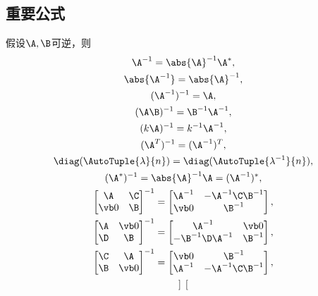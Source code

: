 \subsection*{重要公式}
假设\(\A,\B\)可逆，则\begin{gather*}
	\A^{-1} = \abs{\A}^{-1} \A^*, \\ %
	\abs{\A^{-1}} = \abs{\A}^{-1}, \\ %
	(\A^{-1})^{-1} = \A, \\ %
	(\A \B)^{-1} = \B^{-1} \A^{-1}, \\ %
	(k \A)^{-1} = k^{-1} \A^{-1}, \\ %
	(\A^T)^{-1} = (\A^{-1})^T, \\ %
	\diag(\AutoTuple{\lambda}{n}) = \diag(\AutoTuple{\lambda^{-1}}{n}), \\
	(\A^*)^{-1}
	= \abs{\A}^{-1} \A
	= (\A^{-1})^*, \\ %
	\begin{bmatrix}
		\A & \C \\
		\vb0 & \B
	\end{bmatrix}^{-1}
	= \begin{bmatrix}
		\A^{-1} & -\A^{-1} \C \B^{-1} \\
		\vb0 & \B^{-1}
	\end{bmatrix}, \\
	\begin{bmatrix}
		\A & \vb0 \\
		\D & \B
	\end{bmatrix}^{-1}
	= \begin{bmatrix}
		\A^{-1} & \vb0 \\
		-\B^{-1} \D \A^{-1} & \B^{-1}
	\end{bmatrix}, \\
	\begin{bmatrix}
		\C & \A \\
		\B & \vb0
	\end{bmatrix}^{-1}
	= \begin{bmatrix}
		\vb0 & \B^{-1} \\
		\A^{-1} & -\A^{-1}\C\B^{-1}
	\end{bmatrix}, \\
	\begin{bmatrix}

\end{bmatrix}
\end{gather*}
